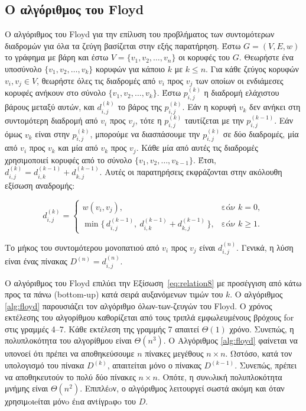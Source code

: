 \documentclass[12pt,a4paper]{article}
\begin{document}
\subsection{Ο αλγόριθμος του \foreignlanguage{english}{Floyd}}
Ο αλγόριθμος του \foreignlanguage{english}{Floyd} για την επίλυση του προβλήματος των συντομότερων διαδρομών για όλα τα ζεύγη βασίζεται στην εξής παρατήρηση. Έστω $G=(V,E,w)$ το γράφημα με βάρη και έστω $V=\{v_1,v_2,\dots,v_n\}$ οι κορυφές του $G$. Θεωρήστε ένα υποσύνολο $\{v_1,v_2,\dots,v_k\}$ κορυφών για κάποιο $k$ με $k\le n$. Για κάθε ζεύγος κορυφών $v_i,v_j\in V$, θεωρήστε όλες τις διαδρομές από $v_i$ προς $v_j$ των οποίων οι ενδιάμεσες κορυφές ανήκουν στο σύνολο $\{v_1,v_2,\dots,v_k\}$. Έστω $p_{i,j}^{(k)}$ η διαδρομή ελάχιστου βάρους μεταξύ αυτών, και $d_{i,j}^{(k)}$ το βάρος της $p_{i,j}^{(k)}$. Εάν η κορυφή $v_k$ δεν ανήκει στη συντομότερη διαδρομή από $v_i$ προς $v_j$, τότε η $p_{i,j}^{(k)}$ ταυτίζεται με την $p_{i,j}^{(k-1)}$. Εάν όμως $v_k$ είναι στην $p_{i,j}^{(k)}$, μπορούμε να διασπάσουμε την $p_{i,j}^{(k)}$ σε δύο διαδρομές, μία από $v_i$ προς $v_k$ και μία από $v_k$ προς $v_j$. Κάθε μία από αυτές τις διαδρομές χρησιμοποιεί κορυφές από το σύνολο $\{v_1,v_2,\dots,v_{k-1}\}$. Έτσι, $d_{i,j}^{(k)} = d_{i,k}^{(k-1)} + d_{k,j}^{(k-1)}$. Αυτές οι παρατηρήσεις εκφράζονται στην ακόλουθη εξίσωση αναδρομής:

\begin{equation}
d_{i,j}^{(k)} = \begin{cases}
w(v_i,v_j), & \text{εάν } k = 0, \\
\min\{\,d_{i,j}^{(k-1)},\ d_{i,k}^{(k-1)} + d_{k,j}^{(k-1)}\,\}, & \text{εάν } k \ge 1.
\end{cases}
\label{eq:relation8}
\end{equation}

Το μήκος του συντομότερου μονοπατιού από $v_i$ προς $v_j$ είναι $d_{i,j}^{(n)}$. Γενικά, η λύση είναι ένας πίνακας $D^{(n)} = d_{i,j}^{(n)}$.

Ο αλγόριθμος του \foreignlanguage{english}{Floyd} επιλύει την Εξίσωση~\ref{eq:relation8} με προσέγγιση από κάτω προς τα πάνω (\foreignlanguage{english}{bottom-up}) κατά σειρά αυξανόμενων τιμών του $k$. Ο αλγόριθμος \ref{alg:floyd} παρουσιάζει τον αλγόριθμο όλων-των-ζευγών του \foreignlanguage{english}{Floyd}. Ο χρόνος εκτέλεσης του αλγορίθμου καθορίζεται από τους τριπλά εμφωλευμένους βρόχους \foreignlanguage{english}{for} στις γραμμές 4–7. Κάθε εκτέλεση της γραμμής 7 απαιτεί $\Theta(1)$ χρόνο. Συνεπώς, η πολυπλοκότητα του αλγορίθμου είναι $\Theta(n^3)$. Ο Αλγόριθμος \ref{alg:floyd} φαίνεται να υπονοεί ότι πρέπει να αποθηκεύσουμε $n$ πίνακες μεγέθους $n\times n$. Ωστόσο, κατά τον υπολογισμό του πίνακα $D^{(k)}$, απαιτείται μόνο ο πίνακας $D^{(k-1)}$. Συνεπώς, πρέπει να αποθηκευτούν το πολύ δύο πίνακες $n\times n$. Οπότε, η συνoλική πολυπλοκότητα μνήμης είναι $\Theta(n^2)$. Επιπλέoν, ο αλγόριθμος λειτουργεί σωστά ακόμη και όταν χρησιμoιeίται μόνo έnα ανtίγρaφo του $D$.
\end{document}
